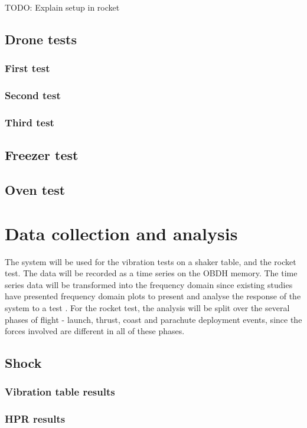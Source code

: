 \documentclass[a4paper,11pt]{article}
\begin{document}
TODO: Explain setup in rocket


\subsection{Drone tests}
\subsubsection{First test}
\subsubsection{Second test}
\subsubsection{Third test}

\subsection{Freezer test}
\subsection{Oven test}


\section{Data collection and analysis}

The system will be used for the vibration tests on a shaker table, and the rocket test. The data will be recorded as a time series on the OBDH memory. The time series data will be transformed into the frequency domain since existing studies have presented frequency domain plots to present and analyse the response of the system to a test \cite{nasa-pyroshock,nieto2019cubesat}. For the rocket test, the analysis will be split over the several phases of flight - launch, thrust, coast and parachute deployment events, since the forces involved are different in all of these phases.

\subsection{Shock}
\subsubsection{Vibration table results}
\subsubsection{HPR results}
\end{document}
